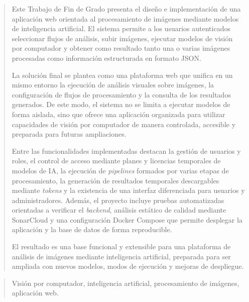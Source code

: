 \documentclass[a4paper,12pt,twoside]{memoir}
\begin{document}
\frontmatter

\renewcommand*\abstractname{Resumen}
\begin{abstract}
Este Trabajo de Fin de Grado presenta el diseño e implementación de una aplicación web orientada al procesamiento de imágenes mediante modelos de inteligencia artificial. El sistema permite a los usuarios autenticados seleccionar flujos de análisis, subir imágenes, ejecutar modelos de visión por computador y obtener como resultado tanto una o varias imágenes procesadas como información estructurada en formato JSON.

La solución final se plantea como una plataforma web que unifica en un mismo entorno la ejecución de análisis visuales sobre imágenes, la configuración de flujos de procesamiento y la consulta de los resultados generados. De este modo, el sistema no se limita a ejecutar modelos de forma aislada, sino que ofrece una aplicación organizada para utilizar capacidades de visión por computador de manera controlada, accesible y preparada para futuras ampliaciones.

Entre las funcionalidades implementadas destacan la gestión de usuarios y roles, el control de acceso mediante planes y licencias temporales de modelos de IA, la ejecución de \textit{pipelines} formados por varias etapas de procesamiento, la generación de resultados temporales descargables mediante \textit{tokens} y la existencia de una interfaz diferenciada para usuarios y administradores. Además, el proyecto incluye pruebas automatizadas orientadas a verificar el \textit{backend}, análisis estático de calidad mediante SonarCloud y una configuración Docker Compose que permite desplegar la aplicación y la base de datos de forma reproducible.

El resultado es una base funcional y extensible para una plataforma de análisis de imágenes mediante inteligencia artificial, preparada para ser ampliada con nuevos modelos, modos de ejecución y mejoras de despliegue.
\end{abstract}

\renewcommand*\abstractname{Descriptores}
\begin{abstract}
	Visión por computador, inteligencia artificial, procesamiento de imágenes, aplicación web.
\end{abstract}

\clearpage
\end{document}
